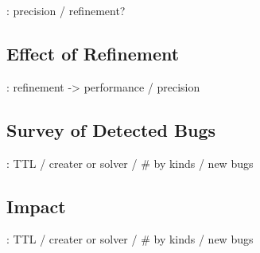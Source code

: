 \todo: precision / refinement?


\subsection{Effect of Refinement}

\todo: refinement -> performance / precision


\subsection{Survey of Detected Bugs}

\todo: TTL / creater or solver / \# by kinds / new bugs


\subsection{Impact}

\todo: TTL / creater or solver / \# by kinds / new bugs
